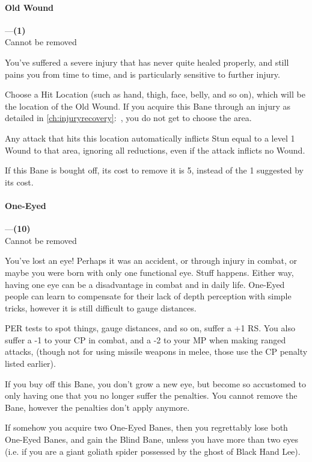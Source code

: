 \documentclass[oneside,11pt,english]{book}
\begin{document}
\paragraph{\label{bane:Old Wound}Old Wound}---\quad\textbf{(1) }\\
{Cannot be removed}\par
You've suffered a severe injury that has never quite healed properly, and still pains you from time to time, and is particularly sensitive to further injury. 


Choose a Hit Location (such as hand, thigh, face, belly, and so on), which will be the location of the Old Wound. If you acquire this Bane through an injury as detailed in \autoref{ch:injuryrecovery}:~, you do not get to choose the area.


Any attack that hits this location automatically inflicts Stun equal to a level 1 Wound to that area, ignoring all reductions, even if the attack inflicts no Wound.


If this Bane is bought off, its cost to remove it is 5, instead of the 1 suggested by its cost. 
\paragraph{\label{bane:One-Eyed}One-Eyed}---\quad\textbf{(10) }\\
{Cannot be removed}\par
You've lost an eye! Perhaps it was an accident, or through injury in combat, or maybe you were born with only one functional eye. Stuff happens. Either way, having one eye can be a disadvantage in combat and in daily life. One-Eyed people can learn to compensate for their lack of depth perception with simple tricks, however it is still difficult to gauge distances.


PER tests to spot things, gauge distances, and so on, suffer a +1 RS. You also suffer a -1 to your CP in combat, and a -2 to your MP when making ranged attacks, (though not for using missile weapons in melee, those use the CP penalty listed earlier).


If you buy off this Bane, you don't grow a new eye, but become so accustomed to only having one that you no longer suffer the penalties. You cannot remove the Bane, however the penalties don't apply anymore.


If somehow you acquire two One-Eyed Banes, then you regrettably lose both One-Eyed Banes, and gain the Blind Bane, unless you have more than two eyes (i.e. if you are a giant goliath spider possessed by the ghost of Black Hand Lee).
\end{document}
